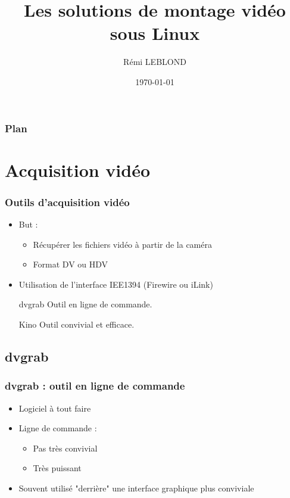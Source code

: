

\title{Les solutions de montage vidéo sous Linux}
\date{\today}
\author{Rémi LEBLOND}




\begin{frame}
 \frametitle{Plan}
 
 \tableofcontents
\end{frame} 

\section{Acquisition vidéo}
\begin{frame}
 \frametitle{Outils d'acquisition vidéo}
\begin{itemize}
\item But : 
\begin{itemize}
\item Récupérer les fichiers vidéo à partir de la caméra
\item Format DV ou HDV
 \end{itemize}
 
 \item Utilisation de l'interface IEE1394 (Firewire ou iLink)
 \end{itemize}
 \begin{itemize}
 \item [dvgrab] Outil en ligne de commande.
 \item [Kino] Outil convivial et efficace.
 \end{itemize}
\end{frame}

\subsection{dvgrab}
\begin{frame}
\frametitle{dvgrab : outil en ligne de commande}
\begin{itemize}
\item Logiciel à tout faire
\item Ligne de commande :
\begin{itemize}
\item Pas très convivial
\item Très puissant
\end{itemize}
\item Souvent utilisé "derrière" une interface graphique plus conviviale
\end{itemize}
\end{frame}

